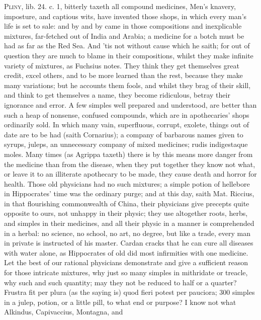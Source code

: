 {\lettrine{P}{liny}, lib. 24. c. 1, bitterly taxeth all compound medicines, 
Men's knavery, imposture, and captious wits, have invented those shops,
in which every man's life is set to sale: and by and by came in those
compositions and inexplicable mixtures, far-fetched out of India and
Arabia; a medicine for a botch must be had as far as the Red Sea. And
'tis not without cause which he saith; for out of question they are
much to blame in their compositions, whilst they make infinite
variety of mixtures, as Fuchsius notes. They think they get
themselves great credit, excel others, and to be more learned than the
rest, because they make many variations; but he accounts them fools,
and whilst they brag of their skill, and think to get themselves a
name, they become ridiculous, betray their ignorance and error. A few
simples well prepared and understood, are better than such a heap of
nonsense, confused compounds, which are in apothecaries' shops
ordinarily sold. In which many vain, superfluous, corrupt, exolete,
things out of date are to be had (saith Cornarius); a company of
barbarous names given to syrups, juleps, an unnecessary company of
mixed medicines; rudis indigestaque moles. Many times (as Agrippa
taxeth) there is by this means more danger from the medicine than
from the disease, when they put together they know not what, or leave
it to an illiterate apothecary to be made, they cause death and horror
for health. Those old physicians had no such mixtures; a simple potion
of hellebore in Hippocrates' time was the ordinary purge; and at this
day, saith Mat. Riccius, in that flourishing commonwealth of
China, their physicians give precepts quite opposite to ours, not
unhappy in their physic; they use altogether roots, herbs, and simples
in their medicines, and all their physic in a manner is comprehended in
a herbal: no science, no school, no art, no degree, but like a trade,
every man in private is instructed of his master. Cardan cracks
that he can cure all diseases with water alone, as Hippocrates of old
did most infirmities with one medicine. Let the best of our rational
physicians demonstrate and give a sufficient reason for those intricate
mixtures, why just so many simples in mithridate or treacle, why such
and such quantity; may they not be reduced to half or a quarter?
Frustra fit per plura (as the saying is) quod fieri potest per
pauciora; 300 simples in a julep, potion, or a little pill, to what end
or purpose? I know not what Alkindus, Capivaccius, Montagna, and
}
